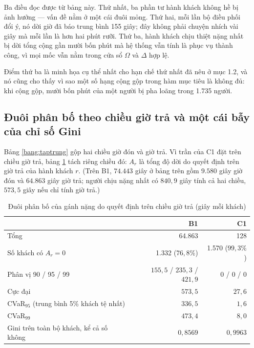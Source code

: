 Ba điều đọc được từ bảng này. Thứ nhất, ba phần tư hành khách không hề bị ảnh hưởng --- vấn đề
nằm ở một cái đuôi mỏng. Thứ hai, mỗi lần bộ điều phối đổi ý, nó dời giờ đã báo trung bình 155
giây; đây không phải chuyện nhích vài giây mà mỗi lần là hơn hai phút rưỡi. Thứ ba, hành khách
chịu thiệt nặng nhất bị dời tổng cộng gần mười bốn phút mà hệ thống vẫn tính là phục vụ thành
công, vì mọi mốc vẫn nằm trong cửa sổ $\Omega$ và $\Delta$ hợp lệ.

Điểm thứ ba là minh họa cụ thể nhất cho hạn chế thứ nhất đã nêu ở mục 1.2, và nó cũng cho thấy
vì sao một số hạng cộng gộp trong hàm mục tiêu là không đủ: khi cộng gộp, mười bốn phút của một
người bị pha loãng trong 1.735 người.

\subsection{Đuôi phân bố theo chiều giờ trả và một cái bẫy của chỉ số Gini}
\label{muc:duoi}

Bảng \ref{bang:taptrung} gộp hai chiều giờ đón và giờ trả. Vì trần của C1 đặt trên chiều giờ trả,
bảng \ref{bang:duoi} tách riêng chiều đó: $A_r$ là tổng độ dời do quyết định trên giờ trả của hành
khách $r$. (Trên B1, $74.443$ giây ở bảng trên gồm $9.580$ giây giờ đón và $64.863$ giây giờ trả;
người chịu nặng nhất có $840{,}9$ giây tính cả hai chiều, $573{,}5$ giây nếu chỉ tính giờ trả.)

\begin{table}[htbp]
\centering
\caption{Đuôi phân bố của gánh nặng do quyết định trên chiều giờ trả (giây mỗi khách)}
\label{bang:duoi}
\small
\begin{tabular}{@{}lrr@{}}
\toprule
& \textbf{B1} & \textbf{C1}\\
\midrule
Tổng & 64.863 & 128\\
Số khách có $A_r = 0$ & 1.332 ($76{,}8\%$) & 1.570 ($99{,}3\%$)\\
Phân vị 90 / 95 / 99 & $155{,}5$ / $235{,}3$ / $421{,}9$ & 0 / 0 / 0\\
Cực đại & $573{,}5$ & $27{,}6$\\
CVaR$_{95}$ (trung bình 5\% khách tệ nhất) & $336{,}5$ & $1{,}6$\\
CVaR$_{99}$ & $473{,}4$ & $8{,}0$\\
\midrule
Gini trên toàn bộ khách, kể cả số không & $0{,}8569$ & $0{,}9963$\\
\bottomrule
\end{tabular}
\end{table}

